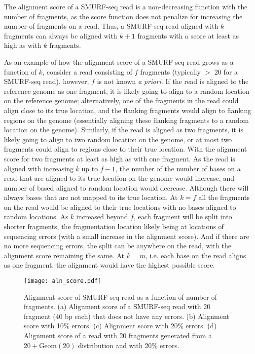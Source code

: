 The alignment score of a SMURF-seq read is a non-decreasing function
with the number of fragments, as the score function does not penalize
for increasing the number of fragments on a read. Thus, a SMURF-seq read
aligned with $k$ fragments can always be aligned with $k+1$ fragments
with a score at least as high as with $k$ fragments.

As an example of how the alignment score of a SMURF-seq read grows as a
function of $k$, consider a read consisting of $f$ fragments (typically
$>$ 20 for a SMURF-seq read), however, $f$ is not known \emph{a priori}.
If the read is aligned to the reference genome as one fragment, it is
likely going to align to a random location on the reference genome;
alternatively, one of the fragments in the read could align close to its
true location, and the flanking fragments would align to flanking
regions on the genome (essentially aligning these flanking fragments to
a random location on the genome).
Similarly, if the read is aligned as two fragments, it is likely going
to align to two random location on the genome, or at most two fragments
could align to regions close to their true location. With the alignment
score for two fragments at least as high as with one fragment.
As the read is aligned with increasing $k$ up to $f-1$, the number of
the number of bases on a read that are aligned to its true location on
the genome would increase, and number of based aligned to random location
would decrease. Although there will always bases that are not mapped to
its true location.
At $k=f$ all the fragments on the read would be aligned to their true
locations with no bases aligned to random locations.
As $k$ increased beyond $f$, each fragment will be split into shorter
fragments, the fragmentation location likely being at locations of
sequencing errors (with a small increase in the alignment score). And if
there are no more sequencing errors, the split can be anywhere on the
read, with the alignment score remaining the same.
At $k=m$, i.e. each base on the read aligns as one fragment, the
alignment would have the highest possible score.

\begin{figure}[t!]
\centering
\texttt{[image: aln\_score.pdf]}
\caption[Alignment score of SMURF-seq read as a function of number of
  fragments]{
  Alignment score of SMURF-seq read as a function of number of
  fragments.
  (a) Alignment score of a SMURF-seq read with 20 fragment (40 bp each)
  that does not have any errors.
  (b) Alignment score with 10\% errors.
  (c) Alignment score with 20\% errors.
  (d) Alignment score of a read with 20 fragments generated from a $20 +
  \text{Geom}(20)$ distribution and with 20\% errors.}
\label{aln_score}
\end{figure}

